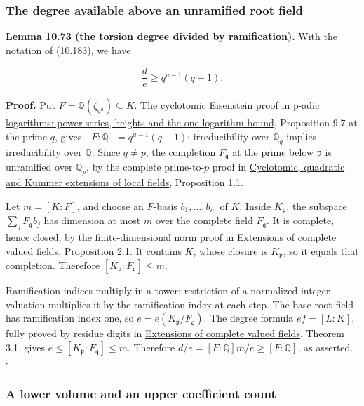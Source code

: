 \documentclass[
  11pt,
  a4paper,
]{article}
\begin{document}
\subsubsection{The degree available above an unramified root
field}\label{the-degree-available-above-an-unramified-root-field}

\textbf{Lemma 10.73 (the torsion degree divided by ramification).} With
the notation of (10.183), we have

\[
\frac d e\ge q^{u-1}(q-1).
\tag{10.192}
\]

\textbf{Proof.} Put \(F=\mathbb Q(\zeta_{q^u})\subseteq K\). The
cyclotomic Eisenstein proof in
\href{../TR-BAKER-09.html\#5-cyclotomic-ramification-and-distances-between-roots}{p-adic
logarithms: power series, heights and the one-logarithm bound},
Proposition 9.7 at the prime \(q\), gives
\([F:\mathbb Q]=q^{u-1}(q-1)\): irreducibility over \(\mathbb Q_q\)
implies irreducibility over \(\mathbb Q\). Since \(q\ne p\), the
completion \(F_{\mathfrak q}\) at the prime below \(\mathfrak p\) is
unramified over \(\mathbb Q_p\), by the complete prime-to-\(p\) proof in
\href{../../NT-LOC/NT-LOC-12.html\#1-two-kinds-of-cyclotomic-extension}{Cyclotomic,
quadratic and Kummer extensions of local fields}, Proposition 1.1.

Let \(m=[K:F]\), and choose an \(F\)-basis \(b_1,\ldots,b_m\) of \(K\).
Inside \(K_{\mathfrak p}\), the subspace \(\sum_jF_{\mathfrak q}b_j\)
has dimension at most \(m\) over the complete field \(F_{\mathfrak q}\).
It is complete, hence closed, by the finite-dimensional norm proof in
\href{../../NT-LOC/NT-LOC-04.html\#2-coordinates-control-convergence}{Extensions
of complete valued fields}, Proposition 2.1. It contains \(K\), whose
closure is \(K_{\mathfrak p}\), so it equals that completion. Therefore
\([K_{\mathfrak p}:F_{\mathfrak q}]\le m\).

Ramification indices multiply in a tower: restriction of a normalized
integer valuation multiplies it by the ramification index at each step.
The base root field has ramification index one, so
\(e=e(K_{\mathfrak p}/F_{\mathfrak q})\). The degree formula
\(ef=[L:K]\), fully proved by residue digits in
\href{../../NT-LOC/NT-LOC-04.html\#3-an-integral-basis-from-residue-digits}{Extensions
of complete valued fields}, Theorem 3.1, gives
\(e\le[K_{\mathfrak p}:F_{\mathfrak q}]\le m\). Therefore
\(d/e=[F:\mathbb Q]m/e\ge[F:\mathbb Q]\), as asserted. \(\square\)

\subsubsection{A lower volume and an upper coefficient
count}\label{a-lower-volume-and-an-upper-coefficient-count}
\end{document}
